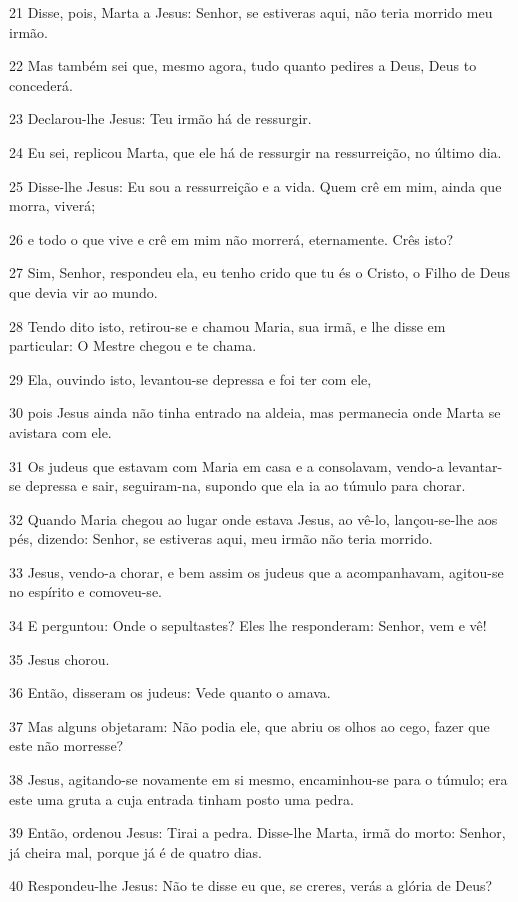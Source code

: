 \par 21 Disse, pois, Marta a Jesus: Senhor, se estiveras aqui, não teria morrido meu irmão.
\par 22 Mas também sei que, mesmo agora, tudo quanto pedires a Deus, Deus to concederá.
\par 23 Declarou-lhe Jesus: Teu irmão há de ressurgir.
\par 24 Eu sei, replicou Marta, que ele há de ressurgir na ressurreição, no último dia.
\par 25 Disse-lhe Jesus: Eu sou a ressurreição e a vida. Quem crê em mim, ainda que morra, viverá;
\par 26 e todo o que vive e crê em mim não morrerá, eternamente. Crês isto?
\par 27 Sim, Senhor, respondeu ela, eu tenho crido que tu és o Cristo, o Filho de Deus que devia vir ao mundo.
\par 28 Tendo dito isto, retirou-se e chamou Maria, sua irmã, e lhe disse em particular: O Mestre chegou e te chama.
\par 29 Ela, ouvindo isto, levantou-se depressa e foi ter com ele,
\par 30 pois Jesus ainda não tinha entrado na aldeia, mas permanecia onde Marta se avistara com ele.
\par 31 Os judeus que estavam com Maria em casa e a consolavam, vendo-a levantar-se depressa e sair, seguiram-na, supondo que ela ia ao túmulo para chorar.
\par 32 Quando Maria chegou ao lugar onde estava Jesus, ao vê-lo, lançou-se-lhe aos pés, dizendo: Senhor, se estiveras aqui, meu irmão não teria morrido.
\par 33 Jesus, vendo-a chorar, e bem assim os judeus que a acompanhavam, agitou-se no espírito e comoveu-se.
\par 34 E perguntou: Onde o sepultastes? Eles lhe responderam: Senhor, vem e vê!
\par 35 Jesus chorou.
\par 36 Então, disseram os judeus: Vede quanto o amava.
\par 37 Mas alguns objetaram: Não podia ele, que abriu os olhos ao cego, fazer que este não morresse?
\par 38 Jesus, agitando-se novamente em si mesmo, encaminhou-se para o túmulo; era este uma gruta a cuja entrada tinham posto uma pedra.
\par 39 Então, ordenou Jesus: Tirai a pedra. Disse-lhe Marta, irmã do morto: Senhor, já cheira mal, porque já é de quatro dias.
\par 40 Respondeu-lhe Jesus: Não te disse eu que, se creres, verás a glória de Deus?
